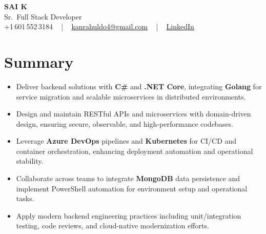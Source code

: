 \documentclass[letterpaper,11pt]{article}
\newcommand{\resumeItem}[1]{
  \item\footnotesize{
    {#1 \vspace{-2pt}}
  }
}
\newcommand{\resumeItemListStart}{\begin{itemize}[leftmargin=*]}
\newcommand{\resumeItemListEnd}{\end{itemize}\vspace{-5pt}}
\begin{document}
\begin{center}
    {\fontsize{14pt}{12pt}\selectfont \textbf{\MakeUppercase{Sai K}}}\\ \vspace{2pt}
    \fontsize{10pt}{12pt}\selectfont Sr.\ Full Stack Developer\\ \vspace{2pt}
    \fontsize{10pt}{12pt}\selectfont +1\,601\,552\,3184 ~ | ~
    \href{mailto:kanrahuldo4@gmail.com}{kanrahuldo4@gmail.com} ~ | ~
    \href{https://www.linkedin.com/in/srrrk/}{\color{blue}\underline{LinkedIn}}
    \vspace{-10pt}
\end{center}

\section{Summary}
\fontsize{9pt}{10pt}\selectfont
\resumeItemListStart
  \resumeItem{Deliver backend solutions with \textbf{C\#} and \textbf{.NET Core}, integrating \textbf{Golang} for service migration and scalable microservices in distributed environments.}
  \resumeItem{Design and maintain RESTful APIs and microservices with domain-driven design, ensuring secure, observable, and high-performance codebases.}
  \resumeItem{Leverage \textbf{Azure DevOps} pipelines and \textbf{Kubernetes} for CI/CD and container orchestration, enhancing deployment automation and operational stability.}
  \resumeItem{Collaborate across teams to integrate \textbf{MongoDB} data persistence and implement PowerShell automation for environment setup and operational tasks.}
  \resumeItem{Apply modern backend engineering practices including unit/integration testing, code reviews, and cloud-native modernization efforts.}
\resumeItemListEnd
\vspace{-6pt}

\end{document}
